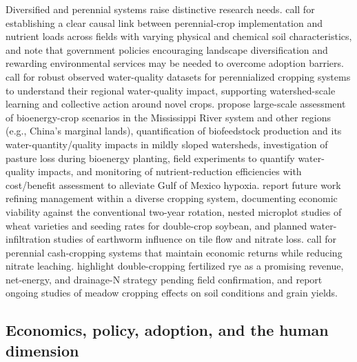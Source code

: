 \documentclass[11pt]{article}
\begin{document}
Diversified and perennial systems raise distinctive research needs. \textcite{Arrueta2022} call for establishing a clear causal link between perennial-crop implementation and nutrient loads across fields with varying physical and chemical soil characteristics, and note that government policies encouraging landscape diversification and rewarding environmental services may be needed to overcome adoption barriers. \textcite{Wilson2023} call for robust observed water-quality datasets for perennialized cropping systems to understand their regional water-quality impact, supporting watershed-scale learning and collective action around novel crops. \textcite{Guo2018} propose large-scale assessment of bioenergy-crop scenarios in the Mississippi River system and other regions (e.g., China's marginal lands), quantification of biofeedstock production and its water-quantity/quality impacts in mildly sloped watersheds, investigation of pasture loss during bioenergy planting, field experiments to quantify water-quality impacts, and monitoring of nutrient-reduction efficiencies with cost/benefit assessment to alleviate Gulf of Mexico hypoxia. \textcite{Gentry2025} report future work refining management within a diverse cropping system, documenting economic viability against the conventional two-year rotation, nested microplot studies of wheat varieties and seeding rates for double-crop soybean, and planned water-infiltration studies of earthworm influence on tile flow and nitrate loss. \textcite{Dinnes2002} call for perennial cash-cropping systems that maintain economic returns while reducing nitrate leaching. \textcite{Malone2018} highlight double-cropping fertilized rye as a promising revenue, net-energy, and drainage-N strategy pending field confirmation, and \textcite{HUNDAL1976} report ongoing studies of meadow cropping effects on soil conditions and grain yields.

\subsection{Economics, policy, adoption, and the human dimension}
\end{document}
